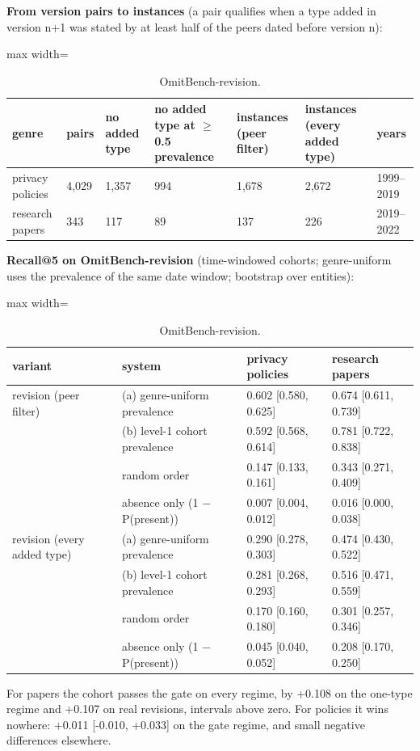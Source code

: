 \documentclass[11pt,a4paper]{article}
\newcommand{\panel}[1]{\par\medskip\noindent #1\par\smallskip}
\begin{document}
\begin{table}[!htbp]
\centering\small
\panel{\textbf{From version pairs to instances} (a pair qualifies when a type added in version n+1 was stated by at least half of the peers dated before version n):}
\begin{adjustbox}{max width=\linewidth}
\begin{tabular}{lllllll}
\toprule
genre & pairs & no added type & no added type at $\geq$ 0.5 prevalence & instances (peer filter) & instances (every added type) & years \\
\midrule
privacy policies & 4,029 & 1,357 & 994 & 1,678 & 2,672 & 1999–2019 \\
research papers & 343 & 117 & 89 & 137 & 226 & 2019–2022 \\
\bottomrule
\end{tabular}
\end{adjustbox}
\panel{\textbf{Recall@5 on OmitBench-revision} (time-windowed cohorts; genre-uniform uses the prevalence of the same date window; bootstrap over entities):}
\begin{adjustbox}{max width=\linewidth}
\begin{tabular}{llll}
\toprule
variant & system & privacy policies & research papers \\
\midrule
revision (peer filter) & (a) genre-uniform prevalence & 0.602 [0.580, 0.625] & 0.674 [0.611, 0.739] \\
 & (b) level-1 cohort prevalence & 0.592 [0.568, 0.614] & 0.781 [0.722, 0.838] \\
 & random order & 0.147 [0.133, 0.161] & 0.343 [0.271, 0.409] \\
 & absence only (1 $-$ P(present)) & 0.007 [0.004, 0.012] & 0.016 [0.000, 0.038] \\
revision (every added type) & (a) genre-uniform prevalence & 0.290 [0.278, 0.303] & 0.474 [0.430, 0.522] \\
 & (b) level-1 cohort prevalence & 0.281 [0.268, 0.293] & 0.516 [0.471, 0.559] \\
 & random order & 0.170 [0.160, 0.180] & 0.301 [0.257, 0.346] \\
 & absence only (1 $-$ P(present)) & 0.045 [0.040, 0.052] & 0.208 [0.170, 0.250] \\
\bottomrule
\end{tabular}
\end{adjustbox}
\caption{OmitBench-revision.}
\end{table}

For papers the cohort passes the gate on every regime, by +0.108 on the one-type regime and +0.107 on real revisions, intervals above zero.  For policies it wins nowhere: +0.011 [-0.010, +0.033] on the gate regime, and small negative differences elsewhere.
\end{document}
